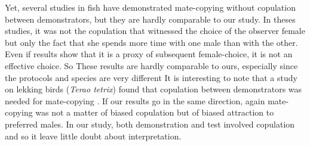 \documentclass[a4paper, 12pt]{article}
\begin{document}
Yet, several studies in fish have demonstrated mate-copying without copulation between demonstrators, but they are hardly comparable to our study. 
In theses studies, it was not the copulation that witnessed the choice of the observer female but only the fact that she spends more time with one male than with the other\parencite{dugatkin_lee_alan_reversal_1992,galef_mate-choice_1998}. Even if \textcite{bischoff_tail_1985} results show that it is a proxy of subsequent female-choice, it is not an effective choice. So These results are hardly comparable to ours, especially since the protocols and species are very different
It is interesting to note that a study on lekking birds (\textit{Terao tetrix}) found that copulation between demonstrators was needed for mate-copying \parencite{hoglund_mate_1995}. If our results go in the same direction, again mate-copying was not a matter of biased copulation but of biased attraction to preferred males. In our study, both demonstration and test involved copulation and so it leave little doubt about interpretation. 

\bigskip
\end{document}
